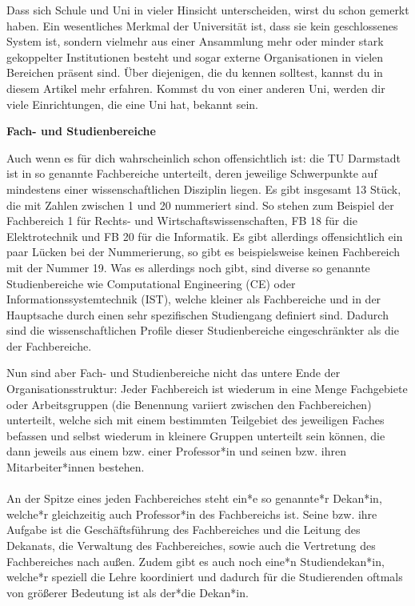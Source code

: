 {Dass sich Schule und Uni in vieler Hinsicht unterscheiden, wirst du schon gemerkt haben. Ein wesentliches Merkmal der Universität ist, dass sie kein geschlossenes System ist, sondern vielmehr aus einer Ansammlung mehr oder minder stark gekoppelter Institutionen besteht und sogar externe Organisationen in vielen Bereichen präsent sind. Über diejenigen, die du kennen solltest, kannst du in diesem Artikel mehr erfahren. Kommst du von einer anderen Uni, werden dir viele Einrichtungen, die eine Uni hat, bekannt sein.
}{\textbf{Fach- und Studienbereiche}

Auch wenn es für dich wahrscheinlich schon offensichtlich ist: die TU Darmstadt ist in so genannte Fachbereiche unterteilt, deren jeweilige Schwerpunkte auf mindestens einer wissenschaftlichen Disziplin liegen. Es gibt insgesamt 13 Stück, die mit Zahlen zwischen 1 und 20 nummeriert sind. So stehen zum Beispiel der Fachbereich 1 für Rechts- und Wirtschaftswissenschaften, FB 18 für die Elektrotechnik und FB 20 für die Informatik. Es gibt allerdings offensichtlich ein paar Lücken bei der Nummerierung, so gibt es beispielsweise keinen Fachbereich mit der Nummer 19. Was es allerdings noch gibt, sind diverse so genannte Studienbereiche wie Computational Engineering (CE) oder Informationssystemtechnik (IST), welche kleiner als Fachbereiche und in der Hauptsache durch einen sehr spezifischen Studiengang definiert sind. Dadurch sind die wissenschaftlichen Profile dieser Studienbereiche eingeschränkter als die der Fachbereiche.

Nun sind aber Fach- und Studienbereiche nicht das untere Ende der Organisationsstruktur: Jeder Fachbereich ist wiederum in eine Menge Fachgebiete oder Arbeitsgruppen (die Benennung variiert zwischen den Fachbereichen) unterteilt, welche sich mit einem bestimmten Teilgebiet des jeweiligen Faches befassen und selbst wiederum in kleinere Gruppen unterteilt sein können, die dann jeweils aus einem bzw. einer Professor*in und seinen bzw. ihren Mitarbeiter*innen bestehen.
\\\\
An der Spitze eines jeden Fachbereiches steht ein*e so genannte*r Dekan*in, welche*r gleichzeitig auch Professor*in des Fachbereichs ist. Seine bzw. ihre Aufgabe ist die Geschäftsführung des Fachbereiches und die Leitung des Dekanats, die Verwaltung des Fachbereiches, sowie auch die Vertretung des Fachbereiches nach außen. Zudem gibt es auch noch eine*n Studiendekan*in, welche*r speziell die Lehre koordiniert und dadurch für die Studierenden oftmals von größerer Bedeutung ist als der*die Dekan*in.\\

}
